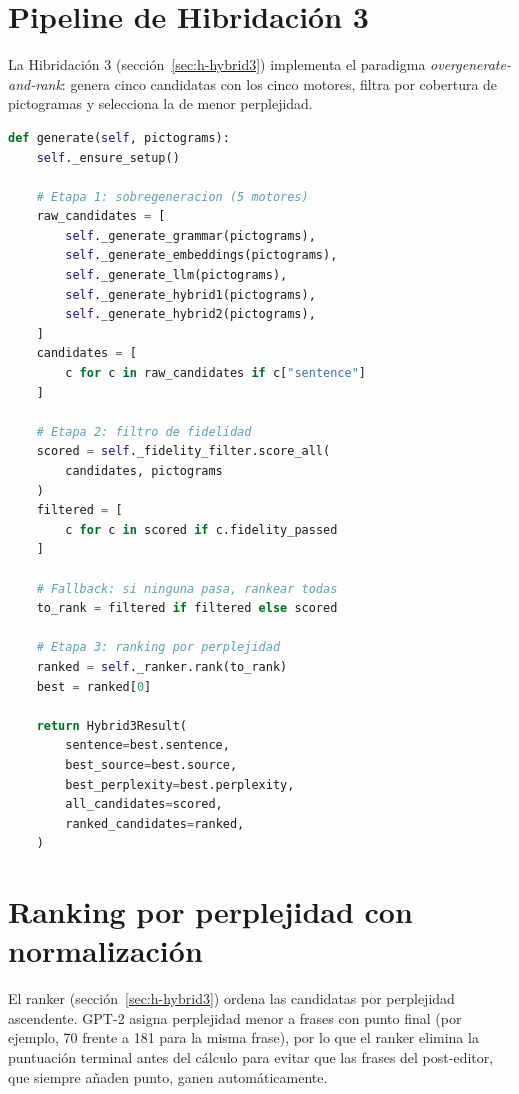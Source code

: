 \section{Pipeline de Hibridación 3}

La Hibridación 3 (sección~\ref{sec:h-hybrid3}) implementa el paradigma \textit{overgenerate-and-rank}: genera cinco candidatas con los cinco motores, filtra por cobertura de pictogramas y selecciona la de menor perplejidad.

\begin{lstlisting}[language=Python,caption={Pipeline Overgenerate-and-Rank (\texttt{overgenerate\_rank.py}).},label={lst:hybrid3-pipeline},basicstyle=\ttfamily\small,xleftmargin=1cm]
def generate(self, pictograms):
    self._ensure_setup()

    # Etapa 1: sobregeneracion (5 motores)
    raw_candidates = [
        self._generate_grammar(pictograms),
        self._generate_embeddings(pictograms),
        self._generate_llm(pictograms),
        self._generate_hybrid1(pictograms),
        self._generate_hybrid2(pictograms),
    ]
    candidates = [
        c for c in raw_candidates if c["sentence"]
    ]

    # Etapa 2: filtro de fidelidad
    scored = self._fidelity_filter.score_all(
        candidates, pictograms
    )
    filtered = [
        c for c in scored if c.fidelity_passed
    ]

    # Fallback: si ninguna pasa, rankear todas
    to_rank = filtered if filtered else scored

    # Etapa 3: ranking por perplejidad
    ranked = self._ranker.rank(to_rank)
    best = ranked[0]

    return Hybrid3Result(
        sentence=best.sentence,
        best_source=best.source,
        best_perplexity=best.perplexity,
        all_candidates=scored,
        ranked_candidates=ranked,
    )
\end{lstlisting}

\section{Ranking por perplejidad con normalización}

El ranker (sección~\ref{sec:h-hybrid3}) ordena las candidatas por perplejidad ascendente. GPT-2 asigna perplejidad menor a frases con punto final (por ejemplo, 70 frente a 181 para la misma frase), por lo que el ranker elimina la puntuación terminal antes del cálculo para evitar que las frases del post-editor, que siempre añaden punto, ganen automáticamente.

